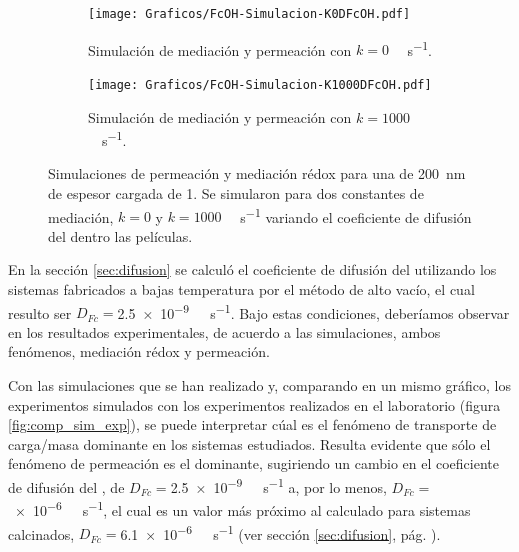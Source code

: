 				\begin{figure}[h!]
				\begin{subfigure}[t]{0.495\textwidth}
					\centering
			 	    \texttt{[image: Graficos/FcOH-Simulacion-K0DFcOH.pdf]}
			        \vspace*{-4mm}
			        \caption{Simulación de mediación y permeación con $k=0$ \si{\per\Molar\per\second}.}
			        \label{fig:sim_med_k0}
			      	\end{subfigure}
				\begin{subfigure}[t]{0.495\textwidth}
					\centering
			 	    \texttt{[image: Graficos/FcOH-Simulacion-K1000DFcOH.pdf]}
			        \vspace*{-4mm}
			        \caption{Simulación de mediación y permeación con $k=1000$ \si{\per\Molar\per\second}.}
			        \label{fig:sim_med_1000}
			      	\end{subfigure}
			      	\vspace*{-1mm}
			      	\caption[Simulación EQ de mediación/permeación]{Simulaciones de permeación y mediación rédox para una \pdm\space de \SI{200}{nm} de espesor cargada de \ru\space \SI{1}{\Molar}. Se simularon para dos constantes de mediación, $k=0$ y $k=1000$ \si{\per\Molar\per\second} variando el coeficiente de difusión del \fc\space dentro las películas.}
			      	\label{fig:sim_med_perm}
			      	\end{figure}
			  	

		En la sección \ref{sec:difusion} se calculó el coeficiente de difusión del \fc\space utilizando los sistemas fabricados a bajas temperatura por el método de alto vacío, el cual resulto ser $D_{Fc}\!\!=$\SI{2.5e-9}{\per\Molar\per\second}. Bajo estas condiciones, deberíamos observar en los resultados experimentales, de acuerdo a las simulaciones, ambos fenómenos, mediación rédox y permeación. 
						
		
	   	Con las simulaciones que se han realizado y, comparando en un mismo gráfico, los experimentos simulados con los experimentos realizados en el laboratorio (figura \ref{fig:comp_sim_exp}), se puede interpretar cúal es el fenómeno de transporte de carga/masa dominante en los sistemas estudiados. Resulta evidente que sólo el fenómeno de permeación es el dominante, sugiriendo un cambio en el coeficiente de difusión del \fc, de $D_{Fc}\!=$\SI{2.5e-9}{\per\Molar\per\second} a, por lo menos, $D_{Fc}\!=$\SI{e-6}{\per\Molar\per\second}, el cual es un valor más próximo al calculado para sistemas calcinados, $D_{Fc}\!=$\SI{6.1e-6}{\per\Molar\per\second} (ver sección \ref{sec:difusion}, pág. \pageref{sec:difusion}). 

